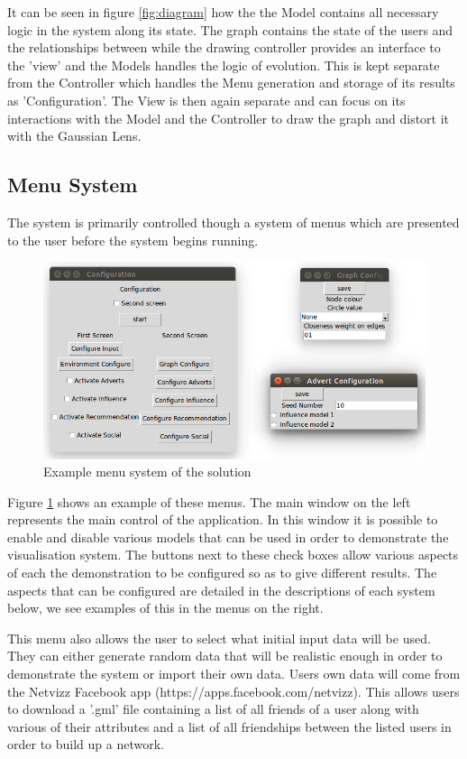\documentclass[12pt,a4paper]{article}
\begin{document}
It can be seen in figure \ref{fig:diagram} how the the Model contains all necessary logic in the system along its state. The graph contains the state of the users and the relationships between while the drawing controller provides an interface to the 'view' and the Models handles the logic of evolution. This is kept separate from the Controller which handles the Menu generation and storage of its results as 'Configuration'. The View is then again separate and can focus on its interactions with the Model and the Controller to draw the graph and distort it with the Gaussian Lens.

\subsection{Menu System}
\noindent
The system is primarily controlled though a system of menus which are presented to the user before the system begins running.

\begin{figure}[htb]
\centering
\caption{Example menu system of the solution}
\label{fig:menu}
\includegraphics[scale=0.5]{MenuShot.png}
\end{figure}

Figure \ref{fig:menu} shows an example of these menus. The main window on the left represents the main control of the application. In this window it is possible to enable and disable various models that can be used in order to demonstrate the visualisation system. The buttons next to these check boxes allow various aspects of each the demonstration to be configured so as to give different results. The aspects that can be configured are detailed in the descriptions of each system below, we see examples of this in the menus on the right.

This menu also allows the user to select what initial input data will be used. They can either generate random data that will be realistic enough in order to demonstrate the system or import their own data. Users own data will come from the Netvizz Facebook app (https://apps.facebook.com/netvizz). This allows users to download a '.gml' file containing a list of all friends of a user along with various of their attributes and a list of all friendships between the listed users in order to build up a network.
\end{document}
